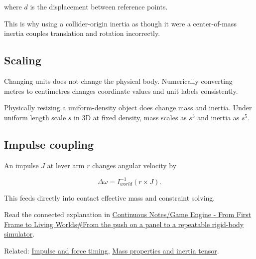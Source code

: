 where \(d\) is the displacement between reference points.

This is why using a collider-origin inertia as though it were a center-of-mass inertia couples translation and rotation incorrectly.

\subsection{Scaling}\label{scaling}

Changing units does not change the physical body. Numerically converting metres to centimetres changes coordinate values and unit labels consistently.

Physically resizing a uniform-density object does change mass and inertia. Under uniform length scale \(s\) in 3D at fixed density, mass scales as \(s^3\) and inertia as \(s^5\).

\subsection{Impulse coupling}\label{impulse-coupling}

An impulse \(J\) at lever arm \(r\) changes angular velocity by

\[
\Delta\omega=I^{-1}_{world}(r\times J).
\]

This feeds directly into contact effective mass and constraint solving.

Read the connected explanation in \href{Continuous\%20Notes/Game\%20Engine\%20-\%20From\%20First\%20Frame\%20to\%20Living\%20Worlds\#From\%20the\%20push\%20on\%20a\%20panel\%20to\%20a\%20repeatable\%20rigid-body\%20simulator}{Continuous Notes/Game Engine - From First Frame to Living Worlds\#From the push on a panel to a repeatable rigid-body simulator}.

Related: \hyperref[appendix-c39931e6e4c2]{Impulse and force timing}, \href{Continuous\%20Notes/Game\%20Engine\%20-\%20From\%20First\%20Frame\%20to\%20Living\%20Worlds\#Part\%201637\%20—\%20Composite-body\%20mass\%20properties}{Mass properties and inertia tensor}.
